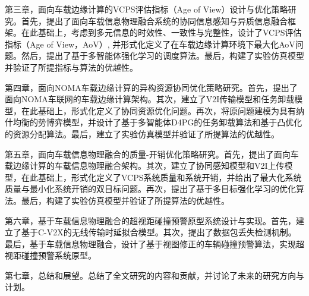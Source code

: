 第三章，面向车载边缘计算的VCPS评估指标（Age of View）设计与优化策略研究。首先，提出了面向车载信息物理融合系统的协同信息感知与异质信息融合框架。在此基础上，考虑到多元信息的时效性、一致性与完整性，设计了VCPS评估指标（Age of View，AoV）, 并形式化定义了在车载边缘计算环境下最大化AoV问题。然后，提出了基于多智能体强化学习的调度算法。最后，构建了实验仿真模型并验证了所提指标与算法的优越性。

第四章，面向NOMA车载边缘计算的异构资源协同优化策略研究。首先，提出了面向NOMA车联网的车载边缘计算架构。其次，建立了V2I传输模型和任务卸载模型，在此基础上，形式化定义了协同资源优化问题。再次，将原问题建模为具有纳什均衡的势博弈模型，并设计了基于多智能体D4PG的任务卸载算法和基于凸优化的资源分配算法。最后，建立了实验仿真模型并验证了所提算法的优越性。

第五章，面向车载信息物理融合的质量-开销优化策略研究。首先，提出了面向车载边缘计算的车载信息物理融合架构。其次，建立了协同感知模型和V2I上传模型，在此基础上，形式化定义了VCPS系统质量和系统开销，并给出了最大化系统质量与最小化系统开销的双目标问题。再次，提出了基于多目标强化学习的优化算法。最后，构建了实验仿真模型并验证了所提算法的优越性。

第六章，基于车载信息物理融合的超视距碰撞预警原型系统设计与实现。首先，建立了基于C-V2X的无线传输时延拟合模型。其次，提出了数据包丢失检测机制。最后，基于车载信息物理融合，设计了基于视图修正的车辆碰撞预警算法，实现超视距碰撞预警系统原型。

第七章，总结和展望。总结了全文研究的内容和贡献，并讨论了未来的研究方向与计划。






